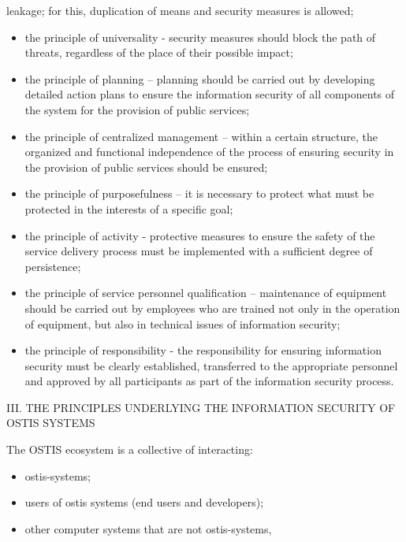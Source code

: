 \documentclass{article}
\begin{document}
\begin{multicols}{2}
\begin{description}[leftmargin=!, labelwidth=0.7cm, itemsep=-1.5mm]
leakage; for this, duplication of means and security
measures is allowed;
\end{description}
\par
\vspace{-0.4cm} \begin{itemize}
    \item the principle of universality - security measures
should block the path of threats, regardless of the
place of their possible impact;
    \item the principle of planning – planning should be carried
out by developing detailed action plans to ensure
the information security of all components of the
system for the provision of public services;
    \item the principle of centralized management – within
a certain structure, the organized and functional
independence of the process of ensuring security in
the provision of public services should be ensured;
    \item the principle of purposefulness – it is necessary to
protect what must be protected in the interests of a
specific goal;
    \item the principle of activity - protective measures to
ensure the safety of the service delivery process
must be implemented with a sufficient degree of
persistence;
    \item the principle of service personnel qualification –
maintenance of equipment should be carried out
by employees who are trained not only in the
operation of equipment, but also in technical issues
of information security;
    \item the principle of responsibility - the responsibility
for ensuring information security must be clearly
established, transferred to the appropriate personnel
and approved by all participants as part of the
information security process.
\end{itemize}
 \begin{center} III.  THE PRINCIPLES UNDERLYING THE INFORMATION
SECURITY OF OSTIS SYSTEMS
\end{center}
The OSTIS ecosystem is a collective of interacting:
\begin{itemize}
    \item ostis-systems;
    \item  users of ostis systems (end users and developers);
    \item other computer systems that are not ostis-systems,

\end{itemize}
\end{multicols}
\end{document}
